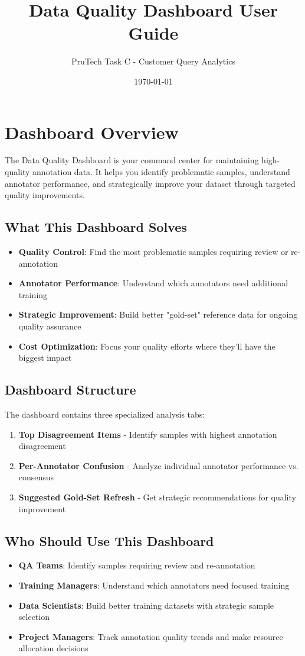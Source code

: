 \documentclass[11pt]{article}
\title{\textbf{Data Quality Dashboard User Guide}}
\author{PruTech Task C - Customer Query Analytics}
\date{\today}
\begin{document}
\maketitle

\tableofcontents
\newpage

\section{Dashboard Overview}

The Data Quality Dashboard is your command center for maintaining high-quality annotation data. It helps you identify problematic samples, understand annotator performance, and strategically improve your dataset through targeted quality improvements.

\subsection{What This Dashboard Solves}
\begin{itemize}
\item \textbf{Quality Control}: Find the most problematic samples requiring review or re-annotation
\item \textbf{Annotator Performance}: Understand which annotators need additional training
\item \textbf{Strategic Improvement}: Build better "gold-set" reference data for ongoing quality assurance
\item \textbf{Cost Optimization}: Focus your quality efforts where they'll have the biggest impact
\end{itemize}

\subsection{Dashboard Structure}
The dashboard contains three specialized analysis tabs:
\begin{enumerate}
\item \textbf{Top Disagreement Items} - Identify samples with highest annotation disagreement
\item \textbf{Per-Annotator Confusion} - Analyze individual annotator performance vs. consensus
\item \textbf{Suggested Gold-Set Refresh} - Get strategic recommendations for quality improvement
\end{enumerate}

\subsection{Who Should Use This Dashboard}
\begin{itemize}
\item \textbf{QA Teams}: Identify samples requiring review and re-annotation
\item \textbf{Training Managers}: Understand which annotators need focused training
\item \textbf{Data Scientists}: Build better training datasets with strategic sample selection
\item \textbf{Project Managers}: Track annotation quality trends and make resource allocation decisions
\end{itemize}
\end{document}
